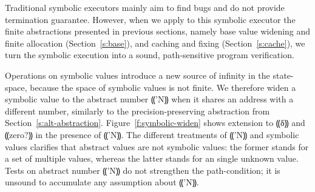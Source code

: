 Traditional symbolic executors mainly aim to find bugs and do not provide
termination guarantee. However, when we apply to this symbolic executor the
finite abstractions presented in previous sections, namely base value widening
and finite allocation (Section~\ref{s:base}), and caching and fixing
(Section~\ref{s:cache}), we turn the symbolic execution into a sound,
path-sensitive program verification.

Operations on symbolic values introduce a new source of infinity in the
state-space, because the space of symbolic values is not finite. We therefore
widen a symbolic value to the abstract number ⸨'N⸩ when it shares an address
with a different number, similarly to the precision-preserving abstraction from
Section~\ref{s:alt-abstraction}. Figure~\ref{f:symbolic-widen} shows extension
to ⸨δ⸩ and ⸨zero?⸩ in the presence of ⸨'N⸩. The different treatments of ⸨'N⸩
and symbolic values clarifies that abstract values are not symbolic values: the
former stands for a set of multiple values, whereas the latter stands for an
single unknown value. Tests on abstract number ⸨'N⸩ do not strengthen the
path-condition; it is unsound to accumulate any assumption about ⸨'N⸩.

